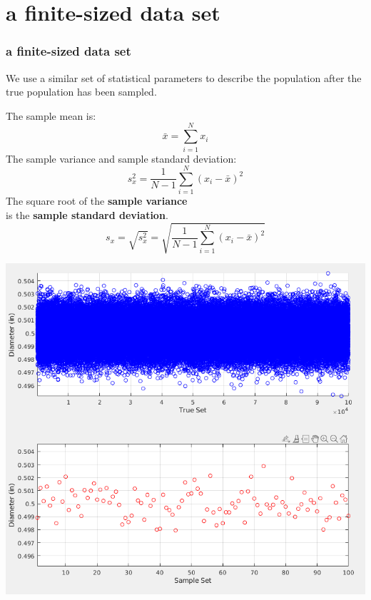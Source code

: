 \documentclass[fleqn]{beamer} %
\newcommand{\sectiontitleIII}{a finite-sized data set}
\begin{document}
\section{\sectiontitleIII}	

	\begin{frame}[label=sectionIII] \small
		\frametitle{\sectiontitleIII}    
		
		We use a similar set of statistical parameters to describe the population after the true population has been sampled.
		
		\begin{multicols}{2} \tiny
		The sample mean is:\\
		\[ \bar{x}=\sum\limits_{i=1}^{N}x_i \]
		The sample variance and sample standard deviation:\\
		\[ s_x^2=\frac{1}{N-1}\sum\limits_{i=1}^{N}\left(x_i-\bar{x}\right)^2 \]
		The square root of the {\bf \BL sample variance} \\
		is the {\bf \PR sample standard deviation}. \\
		\[s_x=\sqrt{s_x^2}=\sqrt{\frac{1}{N-1}\sum\limits_{i=1}^{N}\left(x_i-\bar{x}\right)^2}\]

		\hspace*{0cm}\includegraphics[scale=.20]{topic4_fig1.png}		
		
		\end{multicols}

	\end{frame}
	
\end{document}
